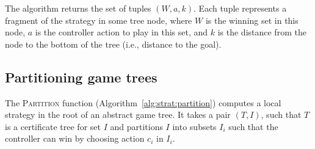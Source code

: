 %

The algorithm returns the set of tuples $(W, a, k)$.  Each tuple
represents a fragment of the strategy in some tree node, where $W$
is the winning set in this node, $a$ is the controller action to
play in this set, and $k$ is the distance from the node to the
bottom of the tree (i.e., distance to the goal).



\subsection{Partitioning game trees}

The \textsc{Partition} function
(Algorithm~\ref{alg:strat:partition}) computes a local strategy in
the root of an abstract game tree.  It takes a pair $(T,I)$, such
that $T$ is a certificate tree for set $I$ and partitions $I$ into
subsets $I_i$ such that the controller can win by choosing action
$c_i$ in $I_i$.


